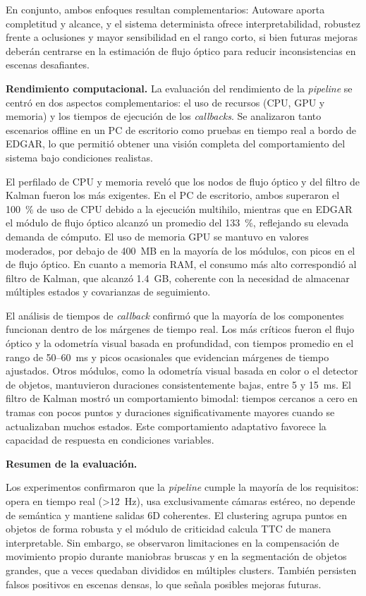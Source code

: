 En conjunto, ambos enfoques resultan
complementarios: Autoware aporta completitud y alcance, y el sistema
determinista ofrece interpretabilidad, robustez frente a oclusiones y mayor
sensibilidad en el rango corto, si bien futuras mejoras deberán centrarse en la
estimación de flujo óptico para reducir inconsistencias en escenas desafiantes.

\bigskip
\noindent \textbf{Rendimiento computacional.}  
La evaluación del rendimiento de la \textit{pipeline} se centró en
dos aspectos complementarios: el uso de recursos (CPU, GPU y memoria) y los
tiempos de ejecución de los \textit{callbacks}. Se analizaron tanto escenarios
offline en un PC de escritorio como pruebas en tiempo real a bordo de EDGAR,
lo que permitió obtener una visión completa del comportamiento del sistema bajo
condiciones realistas.

El perfilado de CPU y memoria reveló que los nodos de flujo óptico y del filtro
de Kalman fueron los más exigentes. En el PC de escritorio, ambos superaron el
100~\% de uso de CPU debido a la ejecución multihilo, mientras que en EDGAR el
módulo de flujo óptico alcanzó un promedio del 133~\%, reflejando su elevada
demanda de cómputo. El uso de memoria GPU se mantuvo en valores moderados, por
debajo de 400~MB en la mayoría de los módulos, con picos en el de flujo óptico.
En cuanto a memoria RAM, el consumo más alto correspondió al filtro de Kalman,
que alcanzó 1.4~GB, coherente con la necesidad de almacenar múltiples estados
y covarianzas de seguimiento.

El análisis de tiempos de \textit{callback} confirmó que la mayoría de los
componentes funcionan dentro de los márgenes de tiempo real. Los más críticos
fueron el flujo óptico y la odometría visual basada en profundidad, con tiempos
promedio en el rango de 50--60~ms y picos ocasionales que evidencian márgenes
de tiempo ajustados. Otros módulos, como la odometría visual basada en color o
el detector de objetos, mantuvieron duraciones consistentemente bajas, entre 5
y 15~ms. El filtro de Kalman mostró un comportamiento bimodal: tiempos cercanos
a cero en tramas con pocos puntos y duraciones significativamente mayores
cuando se actualizaban muchos estados. Este comportamiento adaptativo favorece
la capacidad de respuesta en condiciones variables.

\bigskip
\noindent \textbf{Resumen de la evaluación.}  

Los experimentos confirmaron que la \textit{pipeline} cumple la mayoría de los
requisitos: opera en tiempo real (>12~Hz), usa exclusivamente cámaras estéreo,
no depende de semántica y mantiene salidas 6D coherentes. El clustering agrupa
puntos en objetos de forma robusta y el módulo de criticidad calcula TTC de
manera interpretable. Sin embargo, se observaron limitaciones en la compensación
de movimiento propio durante maniobras bruscas y en la segmentación de objetos grandes,
que a veces quedaban divididos en múltiples clusters. También persisten falsos
positivos en escenas densas, lo que señala posibles mejoras futuras.




